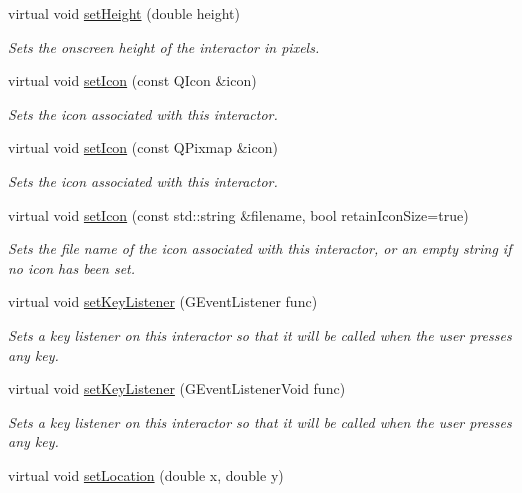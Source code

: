 \begin{DoxyCompactItemize}
virtual void \mbox{\hyperlink{classGInteractor_a9e280bfc4544dfaf8e4376c4e1a74357}{set\+Height}} (double height)
\begin{DoxyCompactList}\small\item\em Sets the onscreen height of the interactor in pixels. \end{DoxyCompactList}\item 
virtual void \mbox{\hyperlink{classGInteractor_a542abfcd7261751352af129c7215ecda}{set\+Icon}} (const Q\+Icon \&icon)
\begin{DoxyCompactList}\small\item\em Sets the icon associated with this interactor. \end{DoxyCompactList}\item 
virtual void \mbox{\hyperlink{classGInteractor_a368e1a338f84401c284506d03b1ba769}{set\+Icon}} (const Q\+Pixmap \&icon)
\begin{DoxyCompactList}\small\item\em Sets the icon associated with this interactor. \end{DoxyCompactList}\item 
virtual void \mbox{\hyperlink{classGInteractor_a762e139aa311461c3984d3ad28293f64}{set\+Icon}} (const std\+::string \&filename, bool retain\+Icon\+Size=true)
\begin{DoxyCompactList}\small\item\em Sets the file name of the icon associated with this interactor, or an empty string if no icon has been set. \end{DoxyCompactList}\item 
virtual void \mbox{\hyperlink{classGInteractor_aeb8324d3287fa1fbe093f4d6230cf0a6}{set\+Key\+Listener}} (G\+Event\+Listener func)
\begin{DoxyCompactList}\small\item\em Sets a key listener on this interactor so that it will be called when the user presses any key. \end{DoxyCompactList}\item 
virtual void \mbox{\hyperlink{classGInteractor_ae48ecea73606c7bd9423e1c7cc589cc9}{set\+Key\+Listener}} (G\+Event\+Listener\+Void func)
\begin{DoxyCompactList}\small\item\em Sets a key listener on this interactor so that it will be called when the user presses any key. \end{DoxyCompactList}\item 
virtual void \mbox{\hyperlink{classGInteractor_a04594e8ba9b98513a64f1da00dcae18c}{set\+Location}} (double x, double y)

\end{DoxyCompactItemize}
